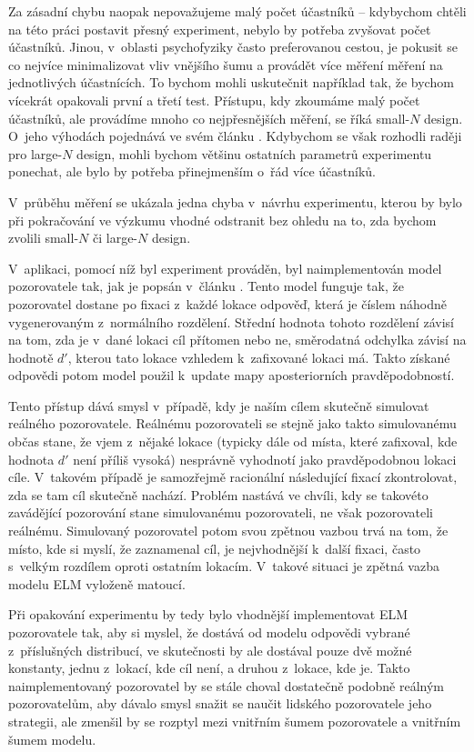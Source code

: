Za zásadní chybu naopak nepovažujeme malý počet účastníků -- kdybychom chtěli
na této práci postavit přesný experiment, nebylo by potřeba zvyšovat počet
účastníků. Jinou, v~oblasti psychofyziky často preferovanou cestou, je pokusit
se co nejvíce minimalizovat vliv vnějšího šumu a provádět více měření měření na
jednotlivých účastnících. To bychom mohli uskutečnit například tak, že bychom
vícekrát opakovali první a třetí test. Přístupu, kdy zkoumáme malý počet
účastníků, ale provádíme mnoho co nejpřesnějších měření, se říká small-$N$
design. O~jeho výhodách pojednává ve svém článku \citet{SmallN}. Kdybychom se
však rozhodli raději pro large-$N$ design, mohli bychom většinu ostatních
parametrů experimentu ponechat, ale bylo by potřeba přinejmenším o~řád více
účastníků.

V~průběhu měření se ukázala jedna chyba v~návrhu experimentu, kterou by
bylo při pokračování ve výzkumu vhodné odstranit bez ohledu na to, zda bychom
zvolili small-$N$ či large-$N$ design. 

V~aplikaci, pomocí níž byl experiment prováděn, byl naimplementován 
model pozorovatele tak, jak je popsán v~článku \citep{Najemnik05}. Tento model
funguje tak, že pozorovatel dostane po fixaci z~každé lokace odpověď, která je
číslem náhodně vygenerovaným z~normálního rozdělení. Střední hodnota tohoto
rozdělení závisí na tom, zda je v~dané lokaci cíl přítomen nebo ne, směrodatná
odchylka závisí na hodnotě $d'$, kterou tato lokace vzhledem k~zafixované lokaci
má. Takto získané odpovědi potom model použil k~update mapy aposteriorních
pravděpodobností.

Tento přístup dává smysl v~případě, kdy je naším cílem skutečně simulovat
reálného pozorovatele. Reálnému pozorovateli se stejně jako takto simulovanému
občas stane, že vjem z~nějaké lokace (typicky dále od místa, které zafixoval,
kde hodnota $d'$ není příliš vysoká) nesprávně vyhodnotí jako pravděpodobnou lokaci
cíle. V~takovém případě je samozřejmě racionální následující fixací
zkontrolovat, zda se tam cíl skutečně nachází. Problém nastává ve chvíli, kdy
se takovéto zavádějící pozorování stane simulovanému pozorovateli, ne však
pozorovateli reálnému. Simulovaný pozorovatel potom svou zpětnou vazbou trvá na
tom, že místo, kde si myslí, že zaznamenal cíl, je nejvhodnější k~další fixaci,
často s~velkým rozdílem oproti ostatním lokacím. V~takové situaci je zpětná
vazba modelu ELM vyloženě matoucí. 

Při opakování experimentu by tedy bylo vhodnější implementovat ELM pozorovatele
tak, aby si myslel, že dostává od modelu odpovědi vybrané z~příslušných
distribucí, ve skutečnosti by ale dostával pouze dvě možné konstanty, jednu
z~lokací, kde cíl není, a druhou z~lokace, kde je. Takto naimplementovaný
pozorovatel by se stále choval dostatečně podobně reálným pozorovatelům, aby
dávalo smysl snažit se naučit lidského pozorovatele jeho strategii, ale zmenšil
by se rozptyl mezi vnitřním šumem pozorovatele a vnitřním šumem modelu.

